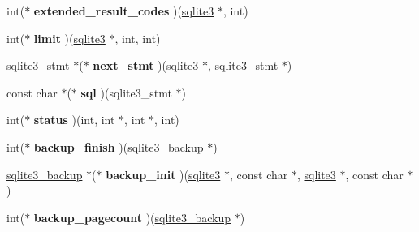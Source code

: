 \begin{DoxyCompactItemize}
\item 
int($\ast$ {\bfseries extended\+\_\+result\+\_\+codes} )(\hyperlink{structsqlite3}{sqlite3} $\ast$, int)\hypertarget{structsqlite3__api__routines_ab1f8f2e2de939f53365bf6b6f439e379}{}\label{structsqlite3__api__routines_ab1f8f2e2de939f53365bf6b6f439e379}

\item 
int($\ast$ {\bfseries limit} )(\hyperlink{structsqlite3}{sqlite3} $\ast$, int, int)\hypertarget{structsqlite3__api__routines_aa48e99fcfae600229799f773c3edfef6}{}\label{structsqlite3__api__routines_aa48e99fcfae600229799f773c3edfef6}

\item 
sqlite3\+\_\+stmt $\ast$($\ast$ {\bfseries next\+\_\+stmt} )(\hyperlink{structsqlite3}{sqlite3} $\ast$, sqlite3\+\_\+stmt $\ast$)\hypertarget{structsqlite3__api__routines_abbfb972997adb1d2ba633757c4be0188}{}\label{structsqlite3__api__routines_abbfb972997adb1d2ba633757c4be0188}

\item 
const char $\ast$($\ast$ {\bfseries sql} )(sqlite3\+\_\+stmt $\ast$)\hypertarget{structsqlite3__api__routines_ae49256600a9579f1d41c345757cb8c76}{}\label{structsqlite3__api__routines_ae49256600a9579f1d41c345757cb8c76}

\item 
int($\ast$ {\bfseries status} )(int, int $\ast$, int $\ast$, int)\hypertarget{structsqlite3__api__routines_a0021bed44509b5085f5187db3aa43eb8}{}\label{structsqlite3__api__routines_a0021bed44509b5085f5187db3aa43eb8}

\item 
int($\ast$ {\bfseries backup\+\_\+finish} )(\hyperlink{structsqlite3__backup}{sqlite3\+\_\+backup} $\ast$)\hypertarget{structsqlite3__api__routines_abb9900ba9f5faed0031817665594eeec}{}\label{structsqlite3__api__routines_abb9900ba9f5faed0031817665594eeec}

\item 
\hyperlink{structsqlite3__backup}{sqlite3\+\_\+backup} $\ast$($\ast$ {\bfseries backup\+\_\+init} )(\hyperlink{structsqlite3}{sqlite3} $\ast$, const char $\ast$, \hyperlink{structsqlite3}{sqlite3} $\ast$, const char $\ast$)\hypertarget{structsqlite3__api__routines_a10dc9a4cb44da0b75596eb0d93eeb1ba}{}\label{structsqlite3__api__routines_a10dc9a4cb44da0b75596eb0d93eeb1ba}

\item 
int($\ast$ {\bfseries backup\+\_\+pagecount} )(\hyperlink{structsqlite3__backup}{sqlite3\+\_\+backup} $\ast$)\hypertarget{structsqlite3__api__routines_ac796f94cb46e331a880131b5dc67e635}{}\label{structsqlite3__api__routines_ac796f94cb46e331a880131b5dc67e635}


\end{DoxyCompactItemize}
